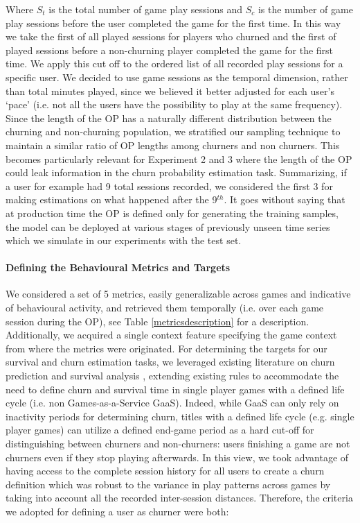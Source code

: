 Where $S_t$ is the total number of game play sessions and $S_c$ is the number of game play sessions before the user completed the game for the first time. In this way we take the first  of all played sessions for players who churned and the first  of played sessions before a non-churning player completed the game for the first time. We apply this cut off to the ordered list of all recorded play sessions for a specific user. We decided to use game sessions as the temporal dimension, rather than total minutes played, since we believed it better adjusted for each user's `pace' (i.e. not all the users have the possibility to play at the same frequency). Since the length of the OP has a naturally different distribution between the churning and non-churning population, we stratified our sampling technique to maintain a similar ratio of OP lengths among churners and non churners. This becomes particularly relevant for Experiment 2 and 3 where the length of the OP could leak information in the churn probability estimation task. Summarizing, if a user for example had 9 total sessions recorded, we considered the first 3 for making estimations on what happened after the 9$^{th}$. It goes without saying that at production time the OP is defined only for generating the training samples, the model can be deployed at various stages of previously unseen time series which we simulate in our experiments with the test set. 

\paragraph*{Defining the Behavioural Metrics and Targets}
We considered a set of 5 metrics, easily generalizable across games and indicative of behavioural activity, and retrieved them temporally  (i.e. over each game session during the OP), see Table \ref{metricsdescription} for a description. Additionally, we acquired a single context feature specifying the game context from where the metrics were originated. For determining the targets for our survival and churn estimation tasks, we leveraged existing literature on churn prediction \cite{drachen2016rapid, milovsevic2017early, lee2018game, perianez2016churn, runge2014churn, kim2017churn, hadiji2014predicting, xie2015predicting} and survival analysis \cite{viljanen2018playtime, demediuk2018player, lee2018game, bertens2017games}, extending existing rules to accommodate the need to define churn and survival time in single player games with a defined life cycle (i.e. non Games-as-a-Service GaaS). Indeed, while GaaS can only rely on inactivity periods for determining churn, titles with a defined life cycle (e.g. single player games) can utilize a defined end-game period as a hard cut-off for distinguishing between churners and non-churners: users finishing a game are not churners even if they stop playing afterwards. In this view, we took advantage of having access to the complete session history for all users to create a churn definition which was robust to the variance in play patterns across games by taking into account all the recorded inter-session distances. Therefore, the criteria we adopted for defining a user as churner were both: 

